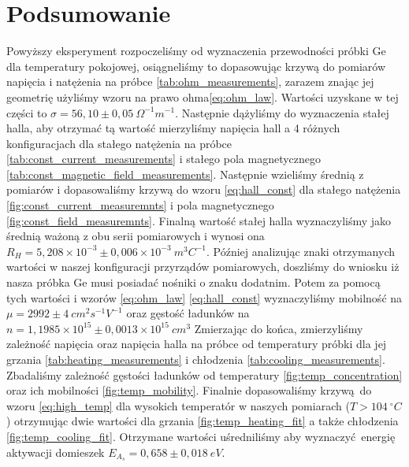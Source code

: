 \documentclass[12pt]{article}
\begin{document}
\section{Podsumowanie}
Powyższy eksperyment rozpoczeliśmy od wyznaczenia przewodności próbki Ge dla temperatury pokojowej, osiągneliśmy to dopasowując krzywą do pomiarów napięcia i natężenia na próbce \ref{tab:ohm_measurements}, 
zarazem znając jej geometrię użyliśmy wzoru na prawo ohma\ref{eq:ohm_law}. Wartości uzyskane w tej części to $\sigma = 56{,}10 \pm 0{,}05 \ \Omega^{-1}m^{-1}$.
Następnie dążyliśmy do wyznaczenia stałej halla, aby otrzymać tą wartość mierzyliśmy napięcia hall a 4 różnych konfiguracjach dla stałego natężenia na próbce \ref{tab:const_current_measurements} i stałego pola magnetycznego \ref{tab:const_magnetic_field_measurements}.
Następnie wzieliśmy średnią z pomiarów i dopasowaliśmy krzywą do wzoru \ref{eq:hall_const} dla stałego natężenia \ref{fig:const_current_measuremnts} i pola magnetycznego \ref{fig:const_field_measuremnts}. 
Finalną wartość stałej halla wyznaczyliśmy jako średnią ważoną z obu serii pomiarowych i wynosi ona $R_H = 5{,}208 \times 10^{-3} \pm 0{,}006 \times 10^{-3} \ m^3C^{-1}$.
Później analizując znaki otrzymanych wartości w naszej konfiguracji przyrządów pomiarowych, doszliśmy do wniosku iż nasza próbka Ge musi posiadać nośniki o znaku dodatnim.
Potem za pomocą tych wartości i wzorów \ref{eq:ohm_law} \ref{eq:hall_const} wyznaczyliśmy mobilność na $\mu = 2992 \pm 4 \ cm^2s^{-1}V^{-1}$ oraz gęstość ładunków na $n = 1{,}1985 \times 10^{15} \pm 0{,}0013 \times 10^{15} \ cm^3$
Zmierzając do końca, zmierzyliśmy zależność napięcia oraz napięcia halla na próbce od temperatury próbki dla jej grzania \ref{tab:heating_measurements} i chłodzenia \ref{tab:cooling_measurements}.
Zbadaliśmy zależność gęstości ładunków od temperatury \ref{fig:temp_concentration} oraz ich mobilności \ref{fig:temp_mobility}.
Finalnie dopasowaliśmy krzywą do wzoru \ref{eq:high_temp} dla wysokich temperatór w naszych pomiarach ($T > 104 \ ^\circ C$) otrzymując dwie wartości dla grzania \ref{fig:temp_heating_fit} a także chłodzenia \ref{fig:temp_cooling_fit}.
Otrzymane wartości uśredniliśmy aby wyznaczyć energię aktywacji domieszek $E_{A_s} = 0{,}658 \pm 0{,}018 \ eV$.
\end{document}
